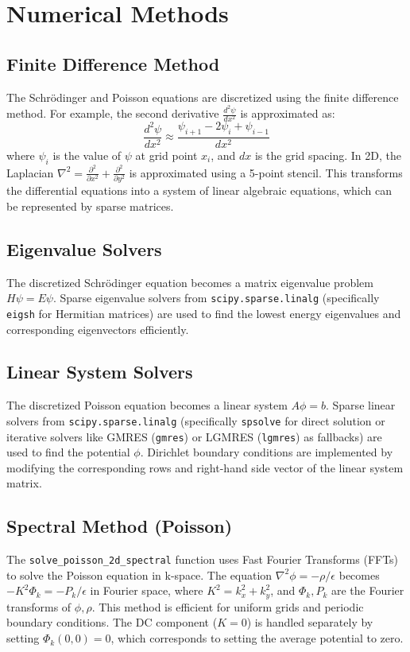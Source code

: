 \documentclass{article}
\begin{document}
\section{Numerical Methods}
\subsection{Finite Difference Method}
The Schrödinger and Poisson equations are discretized using the finite difference method. For example, the second derivative $\frac{d^2\psi}{dx^2}$ is approximated as:
\begin{equation}
    \frac{d^2\psi}{dx^2} \approx \frac{\psi_{i+1} - 2\psi_i + \psi_{i-1}}{dx^2}
\end{equation}
where $\psi_i$ is the value of $\psi$ at grid point $x_i$, and $dx$ is the grid spacing. In 2D, the Laplacian $\nabla^2 = \frac{\partial^2}{\partial x^2} + \frac{\partial^2}{\partial y^2}$ is approximated using a 5-point stencil. This transforms the differential equations into a system of linear algebraic equations, which can be represented by sparse matrices.

\subsection{Eigenvalue Solvers}
The discretized Schrödinger equation becomes a matrix eigenvalue problem $H\psi = E\psi$. Sparse eigenvalue solvers from \texttt{scipy.sparse.linalg} (specifically \texttt{eigsh} for Hermitian matrices) are used to find the lowest energy eigenvalues and corresponding eigenvectors efficiently.

\subsection{Linear System Solvers}
The discretized Poisson equation becomes a linear system $A\phi = b$. Sparse linear solvers from \texttt{scipy.sparse.linalg} (specifically \texttt{spsolve} for direct solution or iterative solvers like GMRES (\texttt{gmres}) or LGMRES (\texttt{lgmres}) as fallbacks) are used to find the potential $\phi$. Dirichlet boundary conditions are implemented by modifying the corresponding rows and right-hand side vector of the linear system matrix.

\subsection{Spectral Method (Poisson)}
The \texttt{solve\_poisson\_2d\_spectral} function uses Fast Fourier Transforms (FFTs) to solve the Poisson equation in k-space. The equation $\nabla^2 \phi = -\rho/\epsilon$ becomes $-K^2 \Phi_k = -P_k/\epsilon$ in Fourier space, where $K^2 = k_x^2 + k_y^2$, and $\Phi_k, P_k$ are the Fourier transforms of $\phi, \rho$. This method is efficient for uniform grids and periodic boundary conditions. The DC component ($K=0$) is handled separately by setting $\Phi_k(0,0)=0$, which corresponds to setting the average potential to zero.
\end{document}

